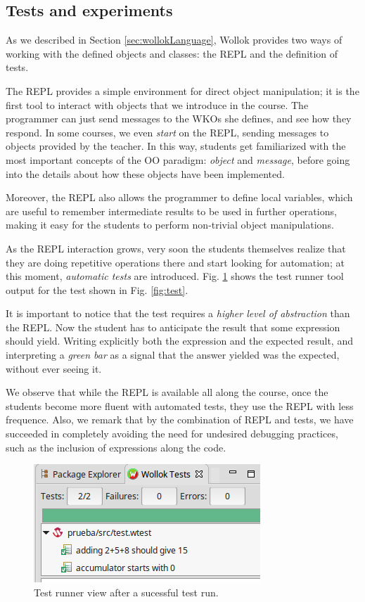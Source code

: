 \subsection{Tests and experiments}
As we described in Section \ref{sec:wollokLanguage}, Wollok provides two ways of working with the defined objects and classes: the REPL and the definition of tests.

The REPL provides a simple environment for direct object manipulation; it is the first tool to interact with objects that we introduce in the course.
The programmer can just send messages to the WKOs she defines, and see how they respond. 
In some courses, we even \emph{start} on the REPL, sending messages to objects provided by the teacher.
In this way, students get familiarized with the most important concepts of the OO paradigm: \emph{object} and \emph{message}, before going into the details about how these objects have been implemented.

Moreover, the REPL also allows the programmer to define local variables, which are useful to remember intermediate results to be used in further operations, making it easy for the students to perform non-trivial object manipulations.

\medskip
As the REPL interaction grows, very soon the students themselves realize that they are doing repetitive operations there and start looking for automation;
at this moment, \emph{automatic tests} are introduced.
Fig. \ref{fig:testRunner.png} shows the test runner tool output for the test shown in Fig. \ref{fig:test}.

It is important to notice that the test requires a \emph{higher level of abstraction} than the REPL.
Now the student has to anticipate the result that some expression should yield. Writing explicitly both the expression and the expected result, and interpreting a \emph{green bar} as a signal that the answer yielded was the expected, without ever seeing it.

We observe that while the REPL is available all along the course, once the students become more fluent with automated tests, they use the REPL with less frequence.
Also, we remark that by the combination of REPL and tests, we have succeeded in completely avoiding the need for undesired debugging practices, such as the inclusion of  expressions along the code.

\begin{figure}[ht]
    \centering
	\includegraphics[scale=0.6]{images/testRunner.png}
    \caption{Test runner view after a sucessful test run.}
    \label{fig:testRunner.png}
\end{figure}


